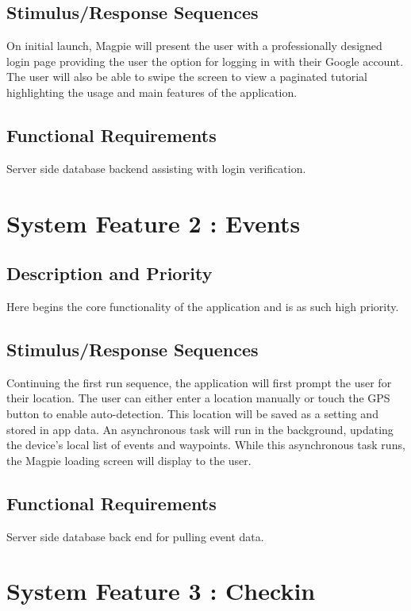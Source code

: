 \documentclass{scrreprt}
\begin{document}
\subsection{Stimulus/Response Sequences}
On initial launch, Magpie will present the user with a professionally designed login
page providing the user the option for logging in with their Google account. The user
will also be able to swipe the screen to view a paginated tutorial highlighting the
usage and main features of the application.

\subsection{Functional Requirements}
Server side database backend assisting with login verification.

\section{System Feature 2 : Events}

\subsection{Description and Priority}
Here begins the core functionality of the application and is as such high priority.

\subsection{Stimulus/Response Sequences}
Continuing the first run sequence, the application will first prompt the user for their location.
The user can either enter a location manually or touch the GPS button to enable auto-detection.
This location will be saved as a setting and stored in app data.
An asynchronous task will run in the background, updating the device's local list of events and waypoints.
While this asynchronous task runs, the Magpie loading screen will display to the user.

\subsection{Functional Requirements}
Server side database back end for pulling event data.

\section{System Feature 3 : Checkin}
\end{document}
